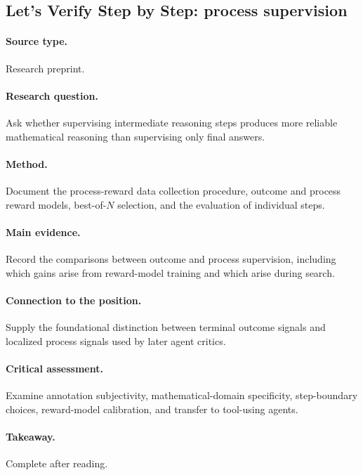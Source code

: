 \subsection{Let's Verify Step by Step: process supervision
\citep{lightman2023verify}}
\paragraph{Source type.} Research preprint.
\paragraph{Research question.} Ask whether supervising intermediate reasoning steps
produces more reliable mathematical reasoning than supervising only final answers.
\paragraph{Method.} Document the process-reward data collection procedure, outcome and
process reward models, best-of-$N$ selection, and the evaluation of individual steps.
\paragraph{Main evidence.} Record the comparisons between outcome and process supervision,
including which gains arise from reward-model training and which arise during search.
\paragraph{Connection to the position.} Supply the foundational distinction between
terminal outcome signals and localized process signals used by later agent critics.
\paragraph{Critical assessment.} Examine annotation subjectivity, mathematical-domain
specificity, step-boundary choices, reward-model calibration, and transfer to tool-using agents.
\paragraph{Takeaway.} Complete after reading.
